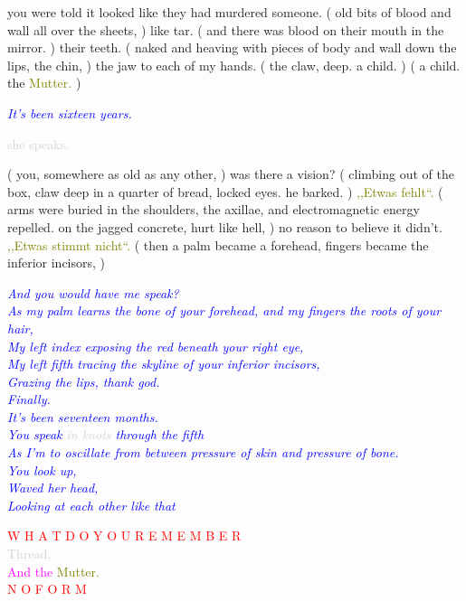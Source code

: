 \documentclass[11pt]{article}
\begin{document}
\begingroup
you were told it looked like they had murdered someone. ( old bits of blood and wall all over the sheets, ) like tar. ( and there was blood on their mouth in the mirror. ) their teeth. ( naked and heaving with pieces of body and wall down the lips, the chin, ) the jaw to each of my hands. ( the claw, deep.  a child. ) ( a child. the \textcolor{olive}{Mutter.} )
\endgroup

\begingroup
\begin{center}
\textit{\textcolor{blue}{It's been sixteen years.}}
\end{center}
\endgroup

\begingroup
\begin{center}
\textcolor{lightgray}{she speaks.}
\rightskip\leftskip
\end{center}
\endgroup

\begingroup
( you, somewhere as old as any other, ) was there a vision? ( climbing out of the box, claw deep in a quarter of bread, locked eyes. he barked. ) \textcolor{olive}{,,Etwas fehlt“.} ( arms were buried in the shoulders, the axillae, and electromagnetic energy repelled. on the jagged concrete, hurt like hell, ) no reason to believe it didn't. \textcolor{olive}{,,Etwas stimmt nicht“.} ( then a palm became a forehead, fingers became the inferior incisors, )
\endgroup

\begingroup
\begin{center}
\textit{\textcolor{blue}{And you would have me speak? \\ As my palm learns the bone of your forehead, and my fingers the roots of your hair, \\ My left index exposing the red beneath your right eye, \\ My left fifth tracing the skyline of your inferior incisors, \\ Grazing the lips, thank god. \\ Finally. \\ It's been seventeen months. \\ You speak} \textcolor{lightgray}{in knots} \textcolor{blue}{through the fifth \\ As I'm to oscillate from between pressure of skin and pressure of bone. \\ You look up, \\ Waved her head, \\ Looking at each other like that } }
\end{center}
\endgroup

\begingroup
\begin{center}
\textcolor{red}{W H A T \hspace{10mm} D O \hspace{10mm} Y O U \hspace{10mm} R E M E M B E R} \\ \textcolor{lightgray}{Thread,} \\ \textcolor{magenta}{And the} \textcolor{olive}{Mutter.} \\ \textcolor{red}{N O \hspace{10mm} F O R M}
\end{center}
\endgroup
\end{document}
